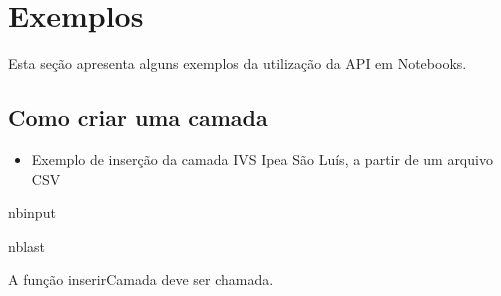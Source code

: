 \documentclass[letterpaper,10pt,brazil]{sphinxmanual}
\begin{document}
\sphinxstepscope


\chapter{Exemplos}
\label{\detokenize{exemplos:exemplos}}\label{\detokenize{exemplos::doc}}
\sphinxAtStartPar
Esta seção apresenta alguns exemplos da utilização da API em Notebooks.

\sphinxstepscope


\section{Como criar uma camada}
\label{\detokenize{exemplos/criando_camada:Como-criar-uma-camada}}\label{\detokenize{exemplos/criando_camada::doc}}\begin{itemize}
\item {} 
\sphinxAtStartPar
Exemplo de inserção da camada IVS Ipea São Luís, a partir de um arquivo CSV

\end{itemize}

\begin{sphinxuseclass}{nbinput}
\begin{sphinxuseclass}{nblast}
{
\begin{sphinxVerbatim}[commandchars=\\\{\}]
\llap{\color{nbsphinxin}[1]:\,\hspace{\fboxrule}\hspace{\fboxsep}} 
 

 
   
\end{sphinxVerbatim}
}

\end{sphinxuseclass}
\end{sphinxuseclass}
\sphinxAtStartPar
A função inserirCamada deve ser chamada.
\end{document}
